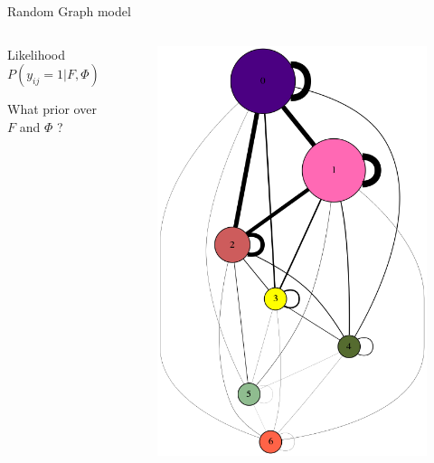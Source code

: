 \begin{frame}[t]{Random Graph model}
\begin{columns}
\begin{column}{0.6\textwidth}
    \begin{block}{Likelihood}
    \[ P(y_{ij}=1 | F, \Phi) = f_i \Phi f_j^T \]
    \end{block}
    What prior over $F$ and $\Phi$ ?
        \end{column}
        \begin{column}{0.4\textwidth}
        \begin{figure}[h]
        \includegraphics[scale=0.15]{img/gdot.png}
        \end{figure}
        \end{column}
    \end{columns}


\end{frame}

\newcommand\setrow{}

